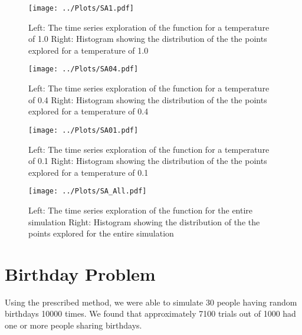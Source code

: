 \documentclass[twocolumn]{myarticle}
\begin{document}
\begin{figure}[ht!]
    \begin{center}
    \texttt{[image: ../Plots/SA1.pdf]}
    \caption{%
        Left: The time series exploration of the function for a temperature of 1.0
        Right: Histogram showing the distribution of the the points explored for a temperature of 1.0
    }
    \label{fig:SA1}
    \end{center}
\end{figure}

\begin{figure}[ht!]
    \begin{center}
    \texttt{[image: ../Plots/SA04.pdf]}
    \caption{%
        Left: The time series exploration of the function for a temperature of 0.4
        Right: Histogram showing the distribution of the the points explored for a temperature of 0.4
    }
    \label{fig:SA04}
    \end{center}
\end{figure}

\begin{figure}[ht!]
    \begin{center}
    \texttt{[image: ../Plots/SA01.pdf]}
    \caption{%
        Left: The time series exploration of the function for a temperature of 0.1
        Right: Histogram showing the distribution of the the points explored for a temperature of 0.1
    }
    \label{fig:SA01}
    \end{center}
\end{figure}

\begin{figure}[ht!]
    \begin{center}
    \texttt{[image: ../Plots/SA\_All.pdf]}
    \caption{%
        Left: The time series exploration of the function for the entire simulation
        Right: Histogram showing the distribution of the the points explored for the entire simulation
            }
    \label{fig:SAAll}
    \end{center}
\end{figure}

\section{Birthday Problem}
Using the prescribed method, we were able to simulate 30 people having random birthdays 10000 times. We found that approximately 7100 trials out of 1000 had one or more people sharing birthdays. 
\end{document}
